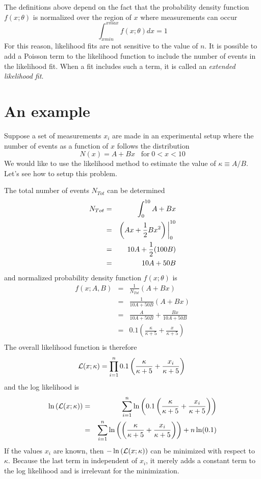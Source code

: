 \documentclass[12pt]{article}
\def\half{{1\over 2}}
\begin{document}
The definitions above depend on the fact that the probability density function $f(x;\theta)$ is normalized
over the region of $x$ where measurements can occur
$$
\int_{xmin}^{xmax} f(x;\theta) dx = 1
$$
For this reason, likelihood fits are not sensitive to the value of $n$.  It is possible to add a Poisson term
to the likelihood function to include the number of events in the likelihood fit.  When a fit includes
such a term, it is called
an {\it extended likelihood fit}.


\section*{An example}

Suppose a set of measurements $x_i$ are made in an experimental setup where the number of
events as a function of $x$ follows the distribution
$$
N(x) = A + Bx \;\;\; \mathrm{ for }\; 0<x<10 
$$
We would like to use the likelihood method to estimate the value of $\kappa \equiv A/B$.  Let's see how to
setup this problem.


The total number of events $N_{Tot}$ can be determined
\begin{eqnarray*}
  N_{Tot} & = & \int_0^{10} A+Bx \\
  & = & \left (Ax+\half B x^2 \right) \bigg|_0^{10} \\
  & = & 10A + \half (100B ) \\
  & = & 10A + 50B \\
\end{eqnarray*}
and  normalized probability density function $f(x;\theta)$ is
\begin{eqnarray*}
  f(x;A,B) & = & \frac{1}{N_{Tot}} \left ( A+Bx \right ) \\
  & = & \frac{1}{10A + 50B} \left ( A+Bx \right ) \\
  & = & \frac{A}{10A+50B} + \frac{Bx}{10A+50B} \\
  & = & 0.1 \left (\frac{\kappa}{\kappa+5} + \frac{x}{\kappa + 5} \right )\\
\end{eqnarray*}
The overall likelihood function is therefore
$$
{\cal L}(x;\kappa) = \prod_{i=1}^n 0.1 \left (\frac{\kappa}{\kappa+5} + \frac{x_i}{\kappa + 5} \right )\\
$$
and the log likelihood is
\begin{eqnarray*}
  \ln \left ( {\cal L}(x;\kappa)\right )  & = & 
  \sum_{i=1}^n \ln \left ( 0.1 \left (\frac{\kappa}{\kappa+5} + \frac{x_i}{\kappa + 5} \right ) \right )\\
  & = & 
    \sum_{i=1}^n \ln \left ( \left (\frac{\kappa}{\kappa+5} + \frac{x_i}{\kappa + 5} \right ) \right )
    + n\ln(0.1) \\
\end{eqnarray*}
If the values $x_i$ are known, then $-\ln \left ( {\cal L}(x;\kappa)\right )$ can be minimized with
respect to $\kappa$.  Because the last term in independent of $x_i$, it merely adds a constant term to the log likelihood
and is irrelevant for the minimization.
\end{document}
